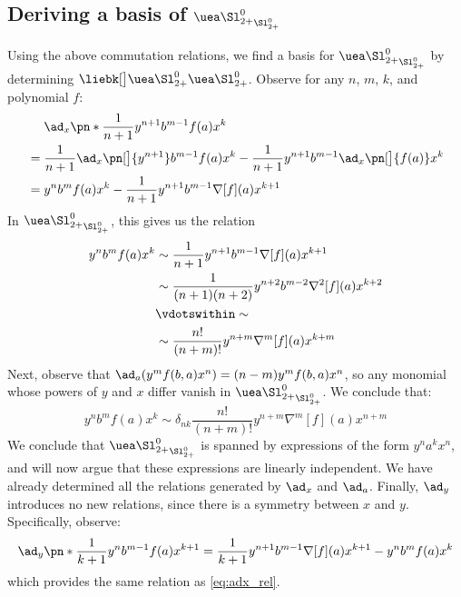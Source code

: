 \documentclass{article}
\begin{document}
\subsection{Deriving a basis of $\CU_{\Alg}$}
Using the above commutation relations, we find a basis for $\CU_{\Alg}$ by
determining $\liebk[\big]\CU\CU$. Observe for any $n$, $m$, $k$, and polynomial
$f$:
\begin{equation}
\begin{aligned}
        &\phantom{{}={}}
                \ad_{x}\pn*{\frac{1}{n+1}y^{n+1}b^{m-1}f(a)x^{k}}\\
        &=
                \frac{1}{n+1}\ad_{x}\pn[\big]{y^{n+1}}b^{m-1}f(a)x^{k}
                -\frac1{n+1}y^{n+1}b^{m-1}\ad_x\pn[\big]{f(a)}x^{k} \\
        &=
                y^{n}b^{m}f(a)x^{k}
                - \frac1{n+1}y^{n+1}b^{m-1}\nabla[f](a)x^{k+1}
\end{aligned}
\end{equation}
In $\CU_{\Alg}$, this gives us the relation
\begin{equation}\label{eq:adx_rel}
\begin{aligned}
        y^{n}b^{m}f(a)x^{k}
        &\sim \frac1{n+1}y^{n+1}b^{m-1}\nabla[f](a)x^{k+1}\\
        &\sim \frac1{(n+1)(n+2)}y^{n+2}b^{m-2}\nabla^2[f](a)x^{k+2}\\
        &\vdotswithin\sim \\
        &\sim \frac{n!}{(n+m)!}y^{n+m}\nabla^m[f](a)x^{k+m}
\end{aligned}
\end{equation}
Next, observe that $\ad_a (y^m f(b, a) x^n ) = (n-m)y^mf(b, a) x^n$, so any
monomial whose powers of $y$ and $x$ differ vanish in $\CU_{\Alg}$. We conclude
that:
\begin{equation}
        y^n b^m f(a) x^k \sim δ_{nk}\frac{n!}{(n+m)!}y^{n+m}\nabla^m[f](a)x^{n+m}
\end{equation}
We conclude that $\CU_{\Alg}$ is spanned by expressions of the form
$y^n a^k x^n$, and will now argue that these expressions are linearly
independent. We have already determined all the relations generated by $\ad_x$
and $\ad_a$. Finally, $\ad_y$ introduces no new relations, since there is a
symmetry between $x$ and $y$. Specifically, observe:
\begin{equation}
        \ad_y\pn*{
                \frac1{k+1}y^n b^{m-1} f(a) x^{k+1}
        }
        =\frac1{k+1} y^{n+1} b^{m-1} \nabla[f](a)x^{k+1} - y^n b^m f(a) x^k
\end{equation}
which provides the same relation as \cref{eq:adx_rel}.
\end{document}
